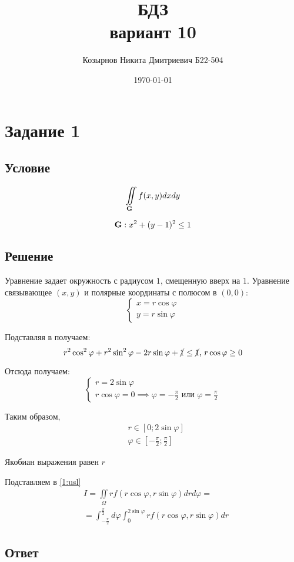 \documentclass{report}
\title{БДЗ\\вариант 10}
\author{Козырнов Никита Дмитриевич Б22-504}
\date{\today}
\newcommand*\task[1]{
       \chapter{#1}
       \section{Условие}
}
\newcommand*\doubleintlabel[3]{
       \begin{equation}
              \label{#3}
              \iint\limits_{#1}#2
       \end{equation}
}
\newcommand*\coordchtwo[2]{
       \begin{cases}
              x = #1\\
              y = #2
       \end{cases}
}
\begin{document}
\maketitle
\tableofcontents
\newpage

\task{Задание 1}

\doubleintlabel{\bf{G}}{f(x,y)dx dy}{1:usl}

\begin{equation}
    \label{1:ogr}
    {\bf{G}}: x^2 + (y - 1)^2 \leq 1
\end{equation}

\section{Решение}

Уравнение задает окружность с радиусом $1$, смещенную вверх на $1$.
Уравнение связывающее $(x,y)$ и полярные координаты с полюсом в $(0,0)$:
$$
    \coordchtwo{r \cos \varphi}{r \sin \varphi}
$$

Подставляя в  получаем:
$$
    r^2 \cos^2 \varphi + r^2 \sin^2 \varphi - 2 r \sin \varphi + \cancel{1} \leq \cancel{1} \mbox{, } r \cos \varphi \geq 0
$$

Отсюда получаем:
$$
    \begin{cases}
        r = 2 \sin \varphi \\
        r \cos \varphi = 0 \implies \varphi = -\frac{\pi}{2} \mbox{ или } \varphi = \frac{\pi}{2}
    \end{cases}
$$

Таким образом,
\begin{align*}
     & r \in [0;2 \sin \varphi]                   \\
     & \varphi \in [-\frac{\pi}{2};\frac{\pi}{2}]
\end{align*}

Якобиан выражения равен $r$


Подставляем в \ref{1:usl}
\begin{align*}
     & I = \iint\limits_{\Omega} r f(r \cos \varphi, r \sin \varphi)dr d \varphi =                                       \\
     & = \int_{-\frac{\pi}{2}}^{\frac{\pi}{2}} d \varphi \int_{0}^{2 \sin \varphi} r f(r \cos \varphi, r \sin \varphi)dr
\end{align*}

\section{Ответ}
\end{document}
